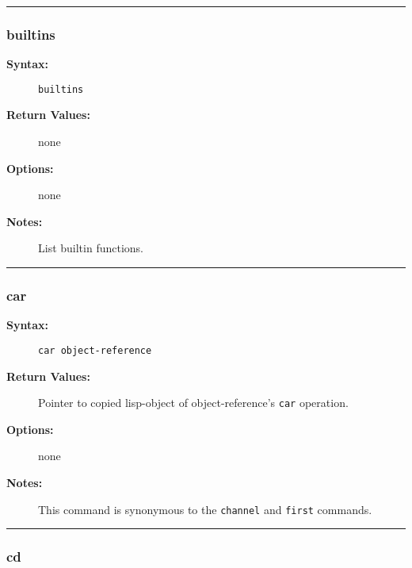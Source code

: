 \hrule
\subsubsection{builtins}

\begin{description}
\item[{\bf Syntax:}] \mbox{}

{\tt builtins}

\item[{\bf Return Values:}] \mbox{}

none  

\item[{\bf Options:}] \mbox{}

none  

\item[{\bf Notes:}] \mbox{}

List builtin functions.

\end{description}


\hrule
\subsubsection{car}

\begin{description}
\item[{\bf Syntax:}] \mbox{}

{\tt car object-reference}

\item[{\bf Return Values:}] \mbox{}

Pointer to copied lisp-object of 
object-reference's {\tt car} operation.

\item[{\bf Options:}] \mbox{}

none  

\item[{\bf Notes:}] \mbox{}

This command is synonymous to the {\tt channel} 
and {\tt first} commands.  

\end{description}


\hrule
\subsubsection{cd}

